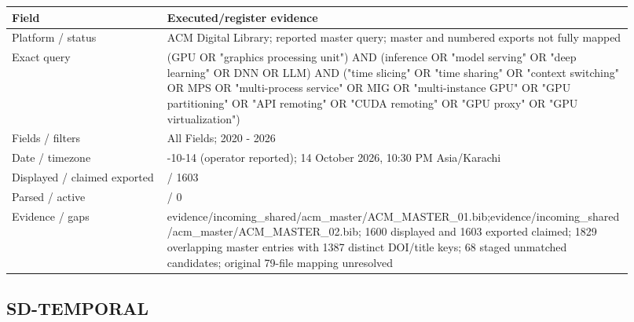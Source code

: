 \documentclass[12pt,a4paper]{article}
\begin{document}
{\small\begin{longtable}{>{\raggedright\arraybackslash}p{0.23\linewidth}>{\raggedright\arraybackslash}p{0.69\linewidth}}
\toprule
Field & Executed/\allowbreak{}register evidence\\\midrule
\endhead
Platform /\allowbreak{} status & ACM Digital Library; reported master query; master and numbered exports not fully mapped\\
Exact query & (GPU OR "graphics processing unit") AND (inference OR "model serving" OR "deep learning" OR DNN OR LLM) AND ("time slicing" OR "time sharing" OR "context switching" OR MPS OR "multi-process service" OR MIG OR "multi-instance GPU" OR "GPU partitioning" OR "API remoting" OR "CUDA remoting" OR "GPU proxy" OR "GPU virtualization")\\
Fields /\allowbreak{} filters & All Fields; 2020 - 2026\\
Date /\allowbreak{} timezone & 2026-10-14 (operator reported); 14 October 2026, 10:\allowbreak{}30 PM Asia/\allowbreak{}Karachi\\
Displayed /\allowbreak{} claimed exported & 1600 /\allowbreak{} 1603\\
Parsed /\allowbreak{} active & 1829 /\allowbreak{} 0\\
Evidence /\allowbreak{} gaps & evidence/\allowbreak{}incoming\_\allowbreak{}shared/\allowbreak{}acm\_\allowbreak{}master/\allowbreak{}ACM\_\allowbreak{}MASTER\_\allowbreak{}01.bib;evidence/\allowbreak{}incoming\_\allowbreak{}shared/\allowbreak{}acm\_\allowbreak{}master/\allowbreak{}ACM\_\allowbreak{}MASTER\_\allowbreak{}02.bib; 1600 displayed and 1603 exported claimed; 1829 overlapping master entries with 1387 distinct DOI/\allowbreak{}title keys; 68 staged unmatched candidates; original 79-file mapping unresolved\\
\bottomrule
\end{longtable}}

\subsection*{SD-TEMPORAL}
\end{document}
